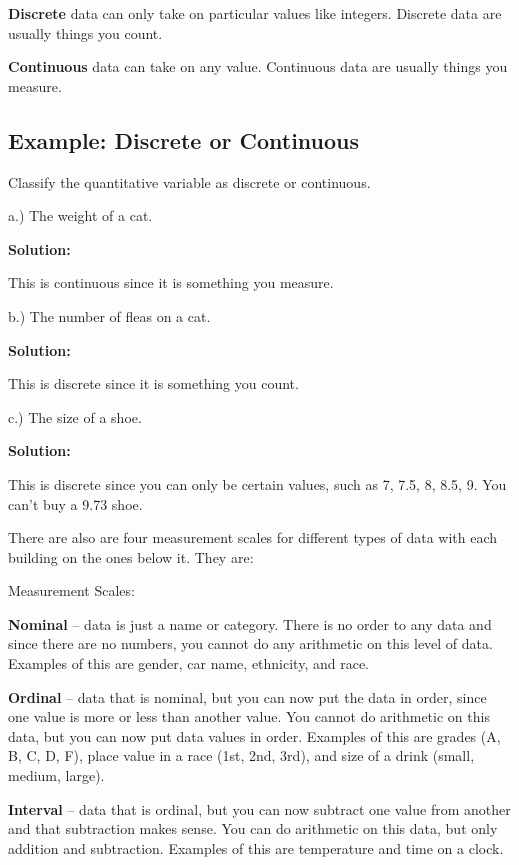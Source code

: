 \documentclass[
]{book}
\begin{document}
\textbf{Discrete} data can only take on particular values like integers. Discrete data are usually things you count.

\textbf{Continuous} data can take on any value. Continuous data are usually things you measure.

\hypertarget{example-discrete-or-continuous}{%
\subsection{Example: Discrete or Continuous}\label{example-discrete-or-continuous}}

Classify the quantitative variable as discrete or continuous.

a.) The weight of a cat.

\textbf{Solution:}

This is continuous since it is something you measure.

b.) The number of fleas on a cat.

\textbf{Solution:}

This is discrete since it is something you count.

c.) The size of a shoe.

\textbf{Solution:}

This is discrete since you can only be certain values, such as 7, 7.5, 8, 8.5, 9. You can't buy a 9.73 shoe.

There are also are four measurement scales for different types of data with each building on the ones below it. They are:

Measurement Scales:

\textbf{Nominal} -- data is just a name or category. There is no order to any data and since there are no numbers, you cannot do any arithmetic on this level of data. Examples of this are gender, car name, ethnicity, and race.

\textbf{Ordinal} -- data that is nominal, but you can now put the data in order, since one value is more or less than another value. You cannot do arithmetic on this data, but you can now put data values in order. Examples of this are grades (A, B, C, D, F), place value in a race (1st, 2nd, 3rd), and size of a drink (small, medium, large).

\textbf{Interval} -- data that is ordinal, but you can now subtract one value from another and that subtraction makes sense. You can do arithmetic on this data, but only addition and subtraction. Examples of this are temperature and time on a clock.
\end{document}
